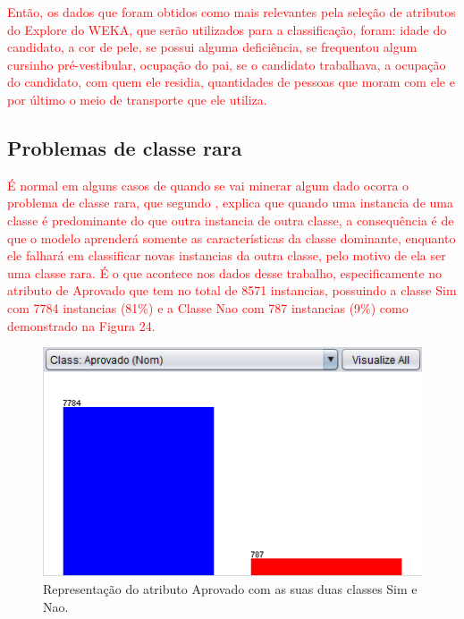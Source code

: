\par
\textcolor{red}{Então, os dados que foram obtidos como mais relevantes pela seleção de atributos do Explore do WEKA, que serão utilizados para a classificação, foram: idade do candidato, a cor de pele, se possui alguma deficiência, se frequentou algum cursinho pré-vestibular, ocupação do pai, se o candidato trabalhava, a ocupação do candidato, com quem ele residia, quantidades de pessoas que moram com ele e por último o meio de transporte que ele utiliza.}

\subsection{Problemas de classe rara}

\par
\textcolor{red}{É normal em alguns casos de quando se vai minerar algum dado ocorra o problema de classe rara, que segundo , explica que quando uma instancia de uma classe é predominante do que outra instancia de outra classe, a consequência é de que o modelo aprenderá somente as características da classe dominante, enquanto ele falhará em classificar novas instancias da outra classe, pelo motivo de ela ser uma classe rara. É o que acontece nos dados desse trabalho, especificamente no atributo de Aprovado que tem no total de 8571 instancias, possuindo a classe Sim com 7784 instancias (81\%) e a Classe Nao com 787 instancias (9\%) como demonstrado na Figura 24.}

\par
\begin{figure}[!htp]
	\begin{center}
    \caption{\label{fig:waveform_fig} Representação do atributo Aprovado com as suas duas classes Sim e Nao.}
	\includegraphics[scale=0.90]{Figuras/Atributo_aprovado.png}
	\end{center}
\end{figure}

